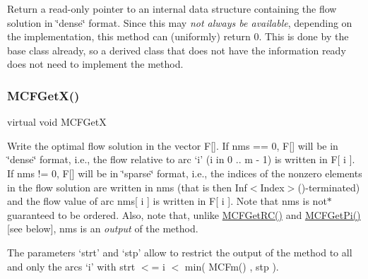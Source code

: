 Return a read-\/only pointer to an internal data structure containing the flow solution in \char`\"{}dense\char`\"{} format. Since this may {\itshape not always be available}, depending on the implementation, this method can (uniformly) return 0. This is done by the base class already, so a derived class that does not have the information ready does not need to implement the method. \mbox{\label{class_s_p_tree_a884f1180138ddf3df909347b1c85428c}} 
\subsubsection{\texorpdfstring{M\+C\+F\+Get\+X()}{MCFGetX()}\hspace{0.1cm}{\footnotesize\ttfamily [2/4]}}
{\footnotesize\ttfamily virtual void M\+C\+F\+GetX}

Write the optimal flow solution in the vector F\mbox{[}\mbox{]}. If nms == 0, F\mbox{[}\mbox{]} will be in \char`\"{}dense\char`\"{} format, i.\+e., the flow relative to arc `i' (i in 0 .. m -\/ 1) is written in F\mbox{[} i \mbox{]}. If nms != 0, F\mbox{[}\mbox{]} will be in \char`\"{}sparse\char`\"{} format, i.\+e., the indices of the nonzero elements in the flow solution are written in nms (that is then Inf$<$\+Index$>$()-\/terminated) and the flow value of arc nms\mbox{[} i \mbox{]} is written in F\mbox{[} i \mbox{]}. Note that nms is not$\ast$ guaranteed to be ordered. Also, note that, unlike \mbox{\hyperlink{class_m_c_f_class_af027cee8179a876a4879c73820c380d1}{M\+C\+F\+Get\+R\+C()}} and \mbox{\hyperlink{class_s_p_tree_a2eb8e4b396fb6d82d56dcb9b7fbe871b}{M\+C\+F\+Get\+Pi()}} \mbox{[}see below\mbox{]}, nms is an {\itshape output} of the method.

The parameters `strt' and `stp' allow to restrict the output of the method to all and only the arcs `i' with strt $<$= i $<$ min( M\+C\+Fm() , stp ). \mbox{\label{class_s_p_tree_add59deabe73d1060973c9fd366d8fde8}} 
